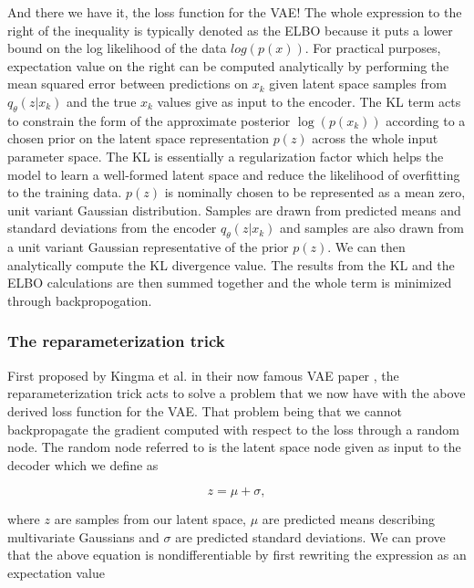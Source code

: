 And there we have it, the loss function for the \ac{VAE}! 
The whole expression to the right of the inequality
is typically denoted as the \ac{ELBO} because it puts a 
lower bound on the log likelihood of the data $log(p(x))$. For 
practical purposes, expectation value on the right can be computed analytically 
by performing the mean squared error between predictions on $x_k$ given 
latent space samples from $q_{\theta}(z|x_k)$ and the true 
$x_k$ values give as input to the encoder. The KL term acts to constrain 
the form of the approximate posterior $\log(p(x_k))$ according to 
a chosen prior on the latent space representation $p(z)$ across the whole input 
parameter space. The KL is essentially a regularization factor which helps 
the model to learn a well-formed latent space and reduce the likelihood 
of overfitting to the training data. $p(z)$ is nominally chosen to be 
represented as a mean zero, unit variant Gaussian distribution. Samples 
are drawn from predicted means and standard deviations from the 
encoder $q_{\theta}(z|x_k)$ and samples are also drawn from a unit variant 
Gaussian representative of the prior $p(z)$. We can then 
analytically compute the KL divergence value. The results from the KL 
and the ELBO calculations are then summed together and the whole term is 
minimized through backpropogation.

%
%
\subsubsection{The reparameterization trick}

First proposed by Kingma et al. in their now famous \ac{VAE} 
paper \cite{1312.6114}, the reparameterization trick acts to 
solve a problem that we now have with the above derived loss 
function for the \ac{VAE}. That problem being that we cannot 
backpropagate the gradient computed with respect to the loss through 
a random node. The random node referred to is the latent space node 
given as input to the decoder which we define as 

\begin{equation}
    z = \mu + \sigma,\label{eq:before_repar} 
\end{equation}

where $z$ are samples from our latent space, $\mu$ are predicted means 
describing multivariate Gaussians and $\sigma$ are predicted standard deviations. 
We can prove that the above equation is nondifferentiable by first rewriting 
the expression as an expectation value


